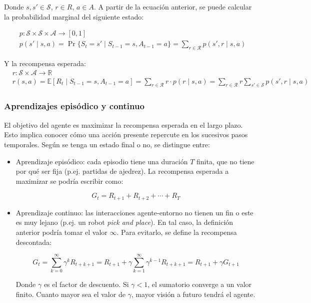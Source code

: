 \documentclass[11pt,a4paper]{article}
\begin{document}
		Donde $s, s' \in \mathcal{S}$, $r \in R$, $a \in A$. A partir de la ecuación anterior, se puede calcular la probabilidad marginal del siguiente estado:
		
		\begin{align}
		& p: \mathcal{S} \times \mathcal{S} \times \mathcal{A} \to [0,1] \nonumber \\
		& p(s' \mid s, a) = \Pr\{S_t = s' \mid S_{t-1} = s, A_{t-1} = a\} = \sum_{r \in \mathcal{R}} p(s', r \mid s, a) 
		\end{align}
		
		Y la recompensa esperada: 
		\begin{align}
		& r: \mathcal{S} \times \mathcal{A} \to \mathbb{R} \nonumber \\
		& r(s, a) = \mathbb{E}[R_t \mid S_{t-1} = s, A_{t-1} = a] = \sum_{r \in \mathcal{R}} r  \cdot p(r \mid s, a) = \sum_{r \in \mathcal{R}} r \sum_{s' \in \mathcal{S}} p(s', r \mid s, a)
		\end{align}
		
		\subsubsection{Aprendizajes episódico y continuo}
		El objetivo del agente es maximizar la recompensa esperada en el largo plazo. Esto implica conocer cómo una acción presente repercute en los sucesivos pasos temporales. Según se tenga un estado final o no, se distingue entre:
		
		\begin{itemize}
			\item Aprendizaje episódico: cada episodio tiene una duración $T$ finita, que no tiene por qué ser fija (p.ej. partidas de ajedrez). La recompensa esperada a maximizar se podría escribir como:
			
			\begin{equation}
			G_t = R_{t+1} + R_{t+2} + \cdots + R_T
			\end{equation}
			
			\item Aprendizaje continuo: las interacciones agente-entorno no tienen un fin o este es muy lejano (p.ej. un robot \textit{pick and place}). En tal caso, la definición anterior podría tomar el valor $\infty$. Para evitarlo, se define la recompensa descontada:
			
			\begin{equation}
			G_t = \sum_{k=0}^{\infty} \gamma^k R_{t+k+1} = R_{t+1} + \gamma \sum_{k=1}^\infty \gamma^{k-1} R_{t+k+1} = R_{t+1} + \gamma G_{t+1}
			\end{equation}
			
			Donde $\gamma$ es el factor de descuento. Si $\gamma < 1$, el sumatorio converge a un valor finito. Cuanto mayor sea el valor de $\gamma$, mayor visión a futuro tendrá el agente.
		\end{itemize}
		
\end{document}
